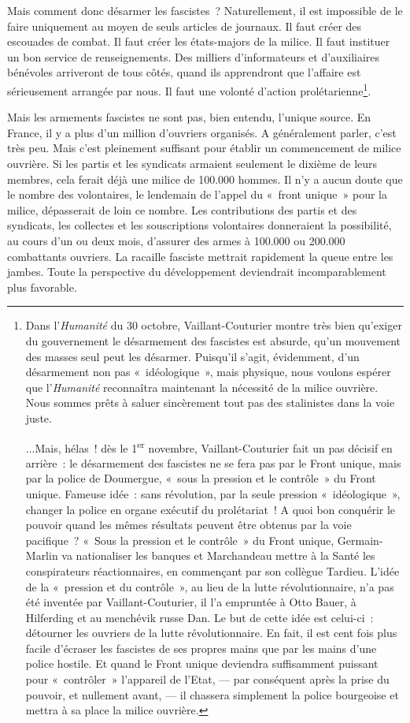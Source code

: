 \documentclass[french,twoside]{book} %
\begin{document}
Mais comment donc désarmer les fascistes ? Naturellement, il est impossible de le faire uniquement au moyen de seuls articles de journaux. Il faut créer des escouades de combat. Il faut créer les états-majors de la milice. Il  faut instituer un bon service de renseignements. Des milliers d’informateurs et d’auxiliaires bénévoles arriveront de tous côtés, quand ils apprendront que l’affaire est sérieusement arrangée par nous. Il faut une volonté d’action prolétarienne\footnote{ \noindent Dans l’\emph{Humanité} du 30 octobre, Vaillant-Couturier montre très bien qu’exiger du gouvernement le désarmement des fascistes est absurde, qu’un mouvement des masses seul peut les désarmer. Puisqu’il s’agit, évidemment, d’un désarmement non pas « idéologique », mais physique, nous voulons espérer que l’\emph{Humanité }reconnaîtra maintenant la nécessité de la milice ouvrière. Nous sommes prêts à saluer sincèrement tout pas des stalinistes dans la voie juste.\par
 ...Mais, hélas ! dès le 1\textsuperscript{er} novembre, Vaillant-Couturier fait un pas décisif en arrière : le désarmement des fascistes ne se fera pas par le Front unique, mais par la police de Doumergue, « sous la pression et le contrôle » du Front unique. Fameuse idée : sans révolution, par la seule pression « idéologique », changer la police en organe exécutif du prolétariat ! A quoi bon conquérir le pouvoir quand les mêmes résultats peuvent être obtenus par la voie pacifique ? « Sous la pression et le contrôle » du Front unique, Germain-Marlin va nationaliser les banques et Marchandeau mettre à la Santé les conspirateurs réactionnaires, en commençant par son collègue Tardieu. L’idée de la « pression et du contrôle », au lieu de la lutte révolutionnaire, n’a pas été inventée par Vaillant-Couturier, il l’a empruntée à Otto Bauer, à Hilferding et au menchévik russe Dan. Le but de cette idée est celui-ci : détourner les ouvriers de la lutte révolutionnaire. En fait, il est cent fois plus facile d’écraser les fascistes de ses propres mains que par les mains d’une police hostile. Et quand le Front unique deviendra suffisamment puissant pour « contrôler » l’appareil de l’Etat, — par conséquent après la prise du pouvoir, et nullement avant, — il chassera simplement la police bourgeoise et mettra à sa place la milice ouvrière.
 }.\par
Mais les armements fascistes ne sont pas, bien entendu, l’unique source. En France, il y a plus d’un million d’ouvriers organisés. A généralement parler, c’est très peu. Mais c’est pleinement suffisant pour établir un commencement de milice ouvrière. Si les partis et les syndicats  armaient seulement le dixième de leurs membres, cela ferait déjà une milice de 100.000 hommes. Il n’y a aucun doute que le nombre des volontaires, le lendemain de l’appel du « front unique » pour la milice, dépasserait de loin ce nombre. Les contributions des partis et des syndicats, les collectes et les souscriptions volontaires donneraient la possibilité, au cours d’un ou deux mois, d’assurer des armes à 100.000 ou 200.000 combattants ouvriers. La racaille fasciste mettrait rapidement la queue entre les jambes. Toute la perspective du développement deviendrait incomparablement plus favorable.\par
\end{document}
